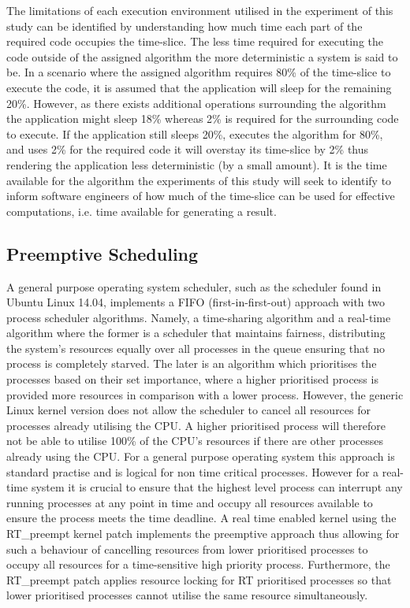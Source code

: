 The limitations of each execution environment utilised in the experiment of this study can be identified by understanding how much time each part of the required code occupies the time-slice. The less time required for executing the code outside of the assigned algorithm the more deterministic a system is said to be. In a scenario where the assigned algorithm requires 80\% of the time-slice to execute the code, it is assumed that the application will sleep for the remaining 20\%. However, as there exists additional operations surrounding the algorithm the application might sleep 18\% whereas 2\% is required for the surrounding code to execute. If the application still sleeps 20\%, executes the algorithm for 80\%, and uses 2\% for the required code it will overstay its time-slice by 2\% thus rendering the application less deterministic (by a small amount). It is the time available for the algorithm the experiments of this study will seek to identify to inform software engineers of how much of the time-slice can be used for effective computations, i.e. time available for generating a result.

\subsection{Preemptive Scheduling}
A general purpose operating system scheduler, such as the scheduler found in Ubuntu Linux 14.04, implements a FIFO (first-in-first-out) approach with two process scheduler algorithms. Namely, a time-sharing algorithm and a real-time algorithm where the former is a scheduler that maintains fairness, distributing the system's resources equally over all processes in the queue ensuring that no process is completely starved. The later is an algorithm which prioritises the processes based on their set importance, where a higher prioritised process is provided more resources in comparison with a lower process. However, the generic Linux kernel version does not allow the scheduler to cancel all resources for processes already utilising the CPU. A higher prioritised process will therefore not be able to utilise 100\% of the CPU's resources if there are other processes already using the CPU. For a general purpose operating system this approach is standard practise and is logical for non time critical processes. However for a real-time system it is crucial to ensure that the highest level process can interrupt any running processes at any point in time and occupy all resources available to ensure the process meets the time deadline. A real time enabled kernel using the RT\_preempt kernel patch implements the preemptive approach thus allowing for such a behaviour of cancelling resources from lower prioritised processes to occupy all resources for a time-sensitive high priority process. Furthermore, the RT\_preempt patch applies resource locking for RT prioritised processes so that lower prioritised processes cannot utilise the same resource simultaneously.

